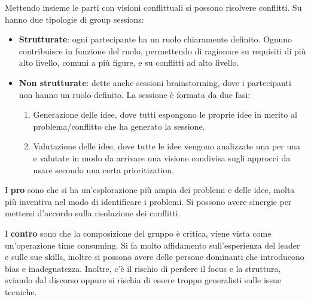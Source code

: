\begin{itemize}
\begin{enumerate}
                        Mettendo insieme le parti con visioni conflittuali si
                        possono risolvere conflitti. Su hanno due tipologie di
                        group sessions:
                        \begin{itemize}
                              \item \textbf{Strutturate}: ogni partecipante ha un
                                    ruolo chiaramente definito. Ognuno contribuisce
                                    in funzione del ruolo, permettendo di ragionare
                                    su requisiti di più alto livello, comuni a
                                    più figure, e su conflitti ad alto livello.
                              \item \textbf{Non strutturate}: dette anche sessioni
                                    brainstorming, dove i partecipanti non hanno
                                    un ruolo definito. La sessione è formata da
                                    due fasi:
                                    \begin{enumerate}
                                          \item Generazione delle idee, dove tutti
                                                espongono le proprie idee in merito
                                                al problema/conflitto che ha
                                                generato la sessione.
                                          \item Valutazione delle idee, dove tutte
                                                le idee vengono analizzate una
                                                per una e valutate in modo da
                                                arrivare una visione condivisa
                                                sugli approcci da usare secondo
                                                una certa prioritization.
                                    \end{enumerate}
                        \end{itemize}
                        I \textbf{pro} sono che si ha un'esplorazione più ampia
                        dei problemi e delle idee, molta più inventiva nel modo
                        di identificare i problemi. Si possono avere sinergie per
                        mettersi d'accordo sulla risoluzione dei conflitti.

                        I \textbf{contro} sono che la composizione del gruppo è
                        critica, viene vista come un'operazione time consuming.
                        Si fa molto affidamento sull'esperienza del leader e
                        sulle sue skills, inoltre si possono avere delle persone
                        dominanti che introducono bias e inadeguatezza. Inoltre,
                        c'è il rischio di perdere il focus e la struttura, sviando
                        dal discorso oppure si rischia di essere troppo generalisti
                        sulle issue tecniche.
            \end{enumerate}
\end{itemize}

